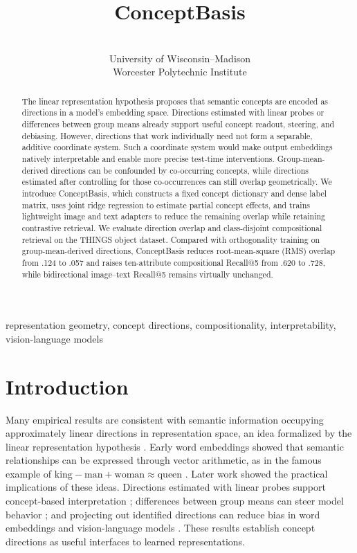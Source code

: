 \documentclass[mlmain,onecolumn]{jmlr}
\title[ConceptBasis]{ConceptBasis}
\author{\Name{Xinyun Zhou} \Email{markjouh@icloud.com}\\
  \addr University of Wisconsin--Madison
  \AND
  \Name{Walter Gerych} \Email{wgerych@wpi.edu}\\
  \addr Worcester Polytechnic Institute}
\begin{document}
\maketitle

\begin{abstract}
The linear representation hypothesis proposes that semantic concepts are encoded as directions in a model's embedding space. Directions estimated with linear probes or differences between group means already support useful concept readout, steering, and debiasing. However, directions that work individually need not form a separable, additive coordinate system. Such a coordinate system would make output embeddings natively interpretable and enable more precise test-time interventions. Group-mean-derived directions can be confounded by co-occurring concepts, while directions estimated after controlling for those co-occurrences can still overlap geometrically. We introduce ConceptBasis, which constructs a fixed concept dictionary and dense label matrix, uses joint ridge regression to estimate partial concept effects, and trains lightweight image and text adapters to reduce the remaining overlap while retaining contrastive retrieval. We evaluate direction overlap and class-disjoint compositional retrieval on the THINGS object dataset. Compared with orthogonality training on group-mean-derived directions, ConceptBasis reduces root-mean-square (RMS) overlap from .124 to .057 and raises ten-attribute compositional Recall@5 from .620 to .728, while bidirectional image--text Recall@5 remains virtually unchanged.
\end{abstract}
\begin{keywords}
representation geometry, concept directions, compositionality, interpretability, vision-language models
\end{keywords}

\section{Introduction}

Many empirical results are consistent with semantic information occupying approximately linear directions in representation space, an idea formalized by the linear representation hypothesis \citep{park2024linear}. Early word embeddings showed that semantic relationships can be expressed through vector arithmetic, as in the famous example of $\text{king}-\text{man}+\text{woman}\approx\text{queen}$ \citep{mikolov2013linguistic}. Later work showed the practical implications of these ideas. Directions estimated with linear probes support concept-based interpretation \citep{kim2018tcav}; differences between group means can steer model behavior \citep{rimsky2024steering}; and projecting out identified directions can reduce bias in word embeddings \citep{bolukbasi2016debiasing} and vision-language models \citep{chuang2023debiasing}. These results establish concept directions as useful interfaces to learned representations.
\end{document}
